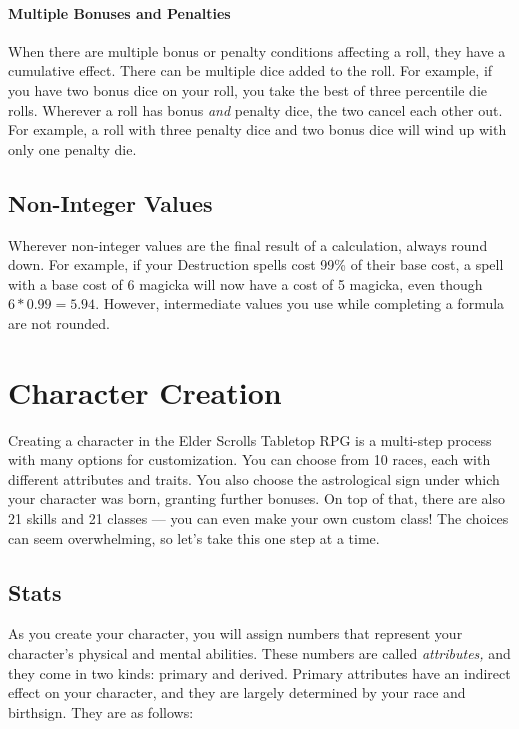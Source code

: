 \documentclass[12pt]{book}
\begin{document}
\subsubsection{Multiple Bonuses and Penalties}
When there are multiple bonus or penalty conditions affecting a roll, they have a cumulative effect. There can be multiple dice added to the roll. For example, if you have two bonus dice on your roll, you take the best of three percentile die rolls. Wherever a roll has bonus \textit{and} penalty dice, the two cancel each other out. For example, a roll with three penalty dice and two bonus dice will wind up with only one penalty die.

\section{Non-Integer Values}
Wherever non-integer values are the final result of a calculation, always round down. For example, if your Destruction spells cost 99\% of their base cost, a spell with a base cost of 6 magicka will now have a cost of 5 magicka, even though $6*0.99=5.94$. However, intermediate values you use while completing a formula are not rounded.

\chapter{Character Creation}
Creating a character in the Elder Scrolls Tabletop RPG is a multi-step process with many options for customization. You can choose from 10 races, each with different attributes and traits. You also choose the astrological sign under which your character was born, granting further bonuses. On top of that, there are also 21 skills and 21 classes --- you can even make your own custom class! The choices can seem overwhelming, so let's take this one step at a time.

\section{Stats}

As you create your character, you will assign numbers that represent your character's physical and mental abilities. These numbers are called \textit{attributes,} and they come in two kinds: primary and derived. Primary attributes have an indirect effect on your character, and they are largely determined by your race and birthsign. They are as follows:
\end{document}
